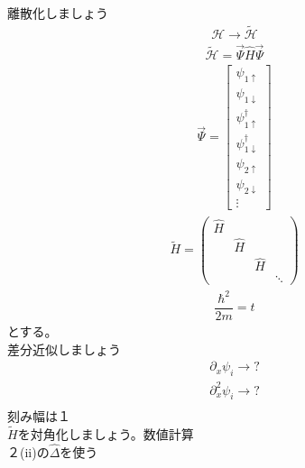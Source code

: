 \documentclass{jarticle}
\begin{document}
離散化しましょう\\
\begin{align}
 \mathcal{H}\rightarrow \tilde{\mathcal{H}}
\end{align}
\begin{align}
  \tilde{\mathcal{H}}=\vec{\Psi}\hat{H}\vec{\Psi}
 \end{align}
 \begin{align}
  \vec{\Psi}=\begin{bmatrix}
  \psi_{1\uparrow} \\
  \psi_{1\downarrow} \\
  \psi_{1\uparrow}^\dagger \\
  \psi_{1\downarrow}^\dagger\\
  \psi_{2\uparrow} \\
  \psi_{2\downarrow} \\
  \vdots
 \end{bmatrix}
\end{align}
\begin{align}
\tilde{H}=
\begin{pmatrix}
\hat{H} &  &  &  \\
& \hat{H} &  &  \\
&  & \hat{H} &  \\
&  &  & \ddots
\end{pmatrix}
\end{align}
\begin{align}
\dfrac{\hbar^2}{2m}=t
\end{align}
とする。\\
差分近似しましょう\\
\begin{align}
\partial_x \psi_i\rightarrow?\\
\partial^2_x \psi_i\rightarrow?\\
\end{align}
刻み幅は$１$\\
$\tilde{H}$を対角化しましょう。数値計算\\
２(ii)の$\hat{\Delta}$を使う\\
\end{document}
